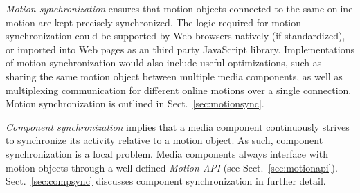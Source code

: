 \emph{Motion synchronization} ensures that motion objects connected to the same
online motion are kept precisely synchronized. The logic required for motion
synchronization could be supported by Web browsers natively (if standardized),
or imported into Web pages as an third party JavaScript library.
Implementations of motion synchronization would also include useful
optimizations, such as sharing the same motion object between multiple media
components, as well as multiplexing communication for different
online motions over a single connection. Motion synchronization is outlined in
Sect.~\ref{sec:motionsync}.

\emph{Component synchronization} implies that a media component continuously strives
to synchronize its activity relative to a motion object. As such, component
synchronization is a local problem. Media components always interface with
motion objects through a well defined \emph{Motion API} (see Sect.~\ref{sec:motionapi}).
Sect.~\ref{sec:compsync} discusses component synchronization in
further detail.
